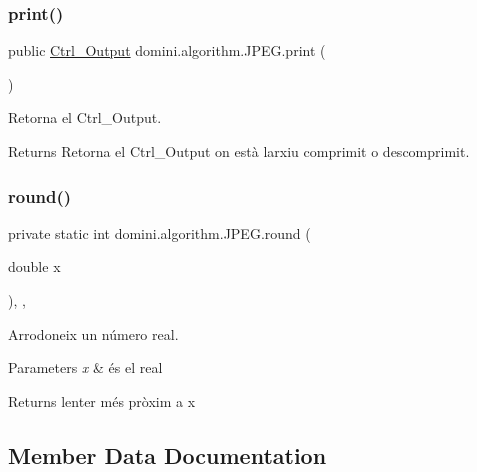\subsubsection{\texorpdfstring{print()}{print()}}
{\footnotesize\ttfamily public \hyperlink{classpersistencia_1_1output_1_1Ctrl__Output}{Ctrl\+\_\+\+Output} domini.\+algorithm.\+J\+P\+E\+G.\+print (\begin{DoxyParamCaption}{ }\end{DoxyParamCaption})\hspace{0.3cm}{\ttfamily [inline]}}



Retorna el Ctrl\+\_\+\+Output. 

\begin{DoxyReturn}{Returns}
Retorna el Ctrl\+\_\+\+Output on està l\textquotesingle{}arxiu comprimit o descomprimit. 
\end{DoxyReturn}
\mbox{\label{classdomini_1_1algorithm_1_1JPEG_aa9c52789d61d5eebdeb13ee39f8e817d}} 
\subsubsection{\texorpdfstring{round()}{round()}}
{\footnotesize\ttfamily private static int domini.\+algorithm.\+J\+P\+E\+G.\+round (\begin{DoxyParamCaption}\item[{double}]{x }\end{DoxyParamCaption})\hspace{0.3cm}{\ttfamily [inline]}, {\ttfamily [static]}, {\ttfamily [private]}}



Arrodoneix un número real. 


\begin{DoxyParams}{Parameters}
{\em x} & és el real \\
\hline
\end{DoxyParams}
\begin{DoxyReturn}{Returns}
l\textquotesingle{}enter més pròxim a x 
\end{DoxyReturn}


\subsection{Member Data Documentation}
\mbox{\label{classdomini_1_1algorithm_1_1JPEG_a3ff24cf46363c31ffa24e3604bf3ced8}} 
